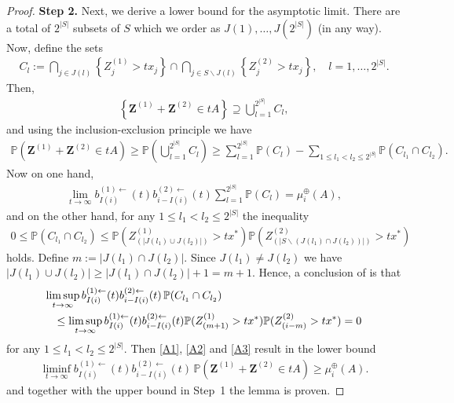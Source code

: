 \documentclass[10pt,a4paper]{amsart}
\newcommand{\E}{\mathbb{E}}
\renewcommand\P{\mathbb{P}}
\def\bZ{\boldsymbol Z}
\newcommand{\beam}{\begin{eqnarray}}
\newcommand{\beao}{\begin{eqnarray*}}
\def\bz{\boldsymbol z}
\newcommand{\eeam}{\end{eqnarray}\noindent}
\newcommand{\eeao}{\end{eqnarray*}\noindent}
\begin{document}
\begin{proof}
 \textbf{Step 2.} Next, we derive a lower bound for the asymptotic limit.
There are a total of $2^{|S|}$ subsets of $S$ which we order as
$J(1),\ldots, J(2^{|S|})$ (in any way). Now, define the sets
\beao
    C_{l}:=\bigcap_{j\in J(l)}\left\{Z_j^{(1)}> t x_j\right\}\cap \bigcap_{j\in S\backslash J(l)}\left\{Z_j^{(2)}> t x_j\right\}, \quad
        l=1,\ldots,2^{|S|}.
\eeao
Then,
\beao
    \left\{\bZ^{(1)}+\bZ^{(2)}\in tA\right\}\supseteq\bigcup_{l=1}^{2^{|S|}}C_l,
\eeao
and using the inclusion-exclusion principle we have
\beam \label{A1}
    \P\left(\bZ^{(1)}+\bZ^{(2)}\in tA\right)\geq \P\left(\bigcup_{l=1}^{2^{|S|}}C_l\right)%
        \geq \sum_{l=1}^{2^{|S|}}\P(C_l)-\sum_{1\leq l_1<l_2\leq 2^{|S|}}\P(C_{l_1}\cap C_{l_2}).
\eeam
Now on one hand,
\beam \label{A2}
    \lim_{t\to\infty}b_{I(i)}^{(1)\leftarrow}(t)b_{i-I(i)}^{(2)\leftarrow}(t)\sum_{l=1}^{2^{|S|}}\P(C_l)=\mu_i^{\oplus}(A),
\eeam
and on the other hand, for any $1\leq l_1<l_2\leq 2^{|S|}$ the inequality
\beao
    0\leq \P(C_{l_1}\cap C_{l_2})\leq \P(Z_{(|J(l_1)\cup J(l_2)|)}^{(1)}>t x^*)\P(Z_{(|S\backslash (J(l_1)\cap J(l_2))|) }^{(2)}>tx^*)
\eeao
holds.  Define $m:=|J(l_1)\cap J(l_2)|$. Since $J(l_1)\not=J(l_2)$ we have $|J(l_1)\cup J(l_2)|\geq |J(l_1)\cap J(l_2)|+1=m+1$.
Hence, a conclusion of  is that
\beam \label{A3}
    \lefteqn{\limsup_{t\to\infty}b_{I(i)}^{(1)\leftarrow}(t)b_{i-I(i)}^{(2)\leftarrow}(t)\,\P(C_{l_1}\cap C_{l_2})}  \\
        &&\leq \limsup_{t\to\infty}b_{I(i)}^{(1)\leftarrow}(t)b_{i-I(i)}^{(2)\leftarrow}(t)
         \P(Z_{(m+1)}^{(1)}>t x^*)\P(Z_{(i-m) }^{(2)}>tx^*) =0 \nonumber
\eeam
for any $1\leq l_1<l_2\leq 2^{|S|}$. Then \eqref{A1}, \eqref{A2} and \eqref{A3} result in the lower bound
\beao
    \liminf_{t\to\infty}b_{I(i)}^{(1)\leftarrow}(t)b_{i-I(i)}^{(2)\leftarrow}(t)\,\P\left(\bZ^{(1)}+\bZ^{(2)}\in tA\right)
    \geq \mu_i^{\oplus}(A).%
\eeao
and together with the upper bound in Step~1 the lemma is proven.
\end{proof}
\end{document}
